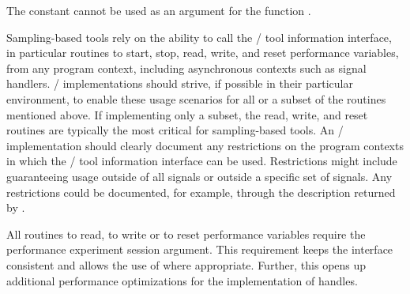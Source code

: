 The constant  cannot be used as an
argument for the  function .

\begin{implementors}
Sampling-based tools rely on the ability to call the \MPI/ tool information
interface, in particular routines to start, stop, read, write, and reset
performance variables, from any program context, including asynchronous
contexts such as signal handlers.  \MPI/ implementations should strive, if
possible in their particular environment, to enable these usage scenarios
for all or a subset of the routines mentioned above.  If implementing only
a subset, the read, write, and reset routines are typically the most
critical for sampling-based tools.  An \MPI/ implementation should clearly
document any restrictions on the program contexts in which the \MPI/ tool
information interface can be used.  Restrictions might include guaranteeing
usage outside of all signals or outside a specific set of signals.  Any
restrictions could be documented, for example, through the description
returned by .
\end{implementors}

\begin{rationale}
All routines to read, to write or to reset performance variables require
the performance experiment session argument.  This requirement keeps the interface consistent and
allows the use of   where appropriate.
Further, this opens up additional performance optimizations for the
implementation of handles.
\end{rationale}


